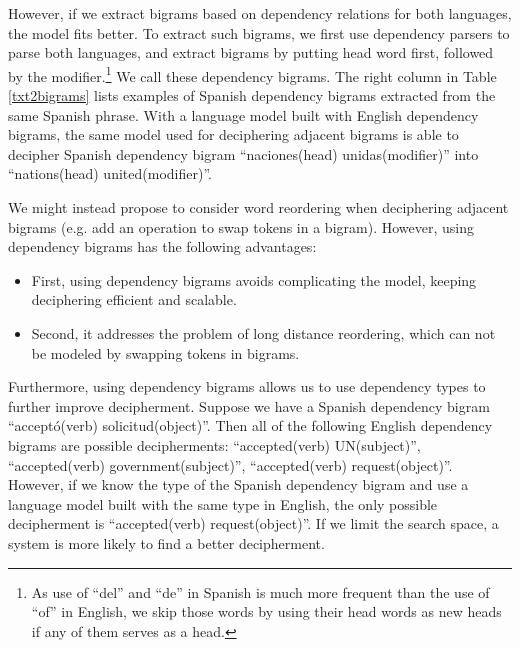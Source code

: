 However, if we extract bigrams based on dependency relations for both languages, the model fits better. To extract such bigrams, we first use dependency parsers to parse both languages, and extract bigrams by putting head word first, followed by the modifier.\footnote{As use of ``del'' and ``de'' in Spanish is much more frequent than the use of ``of'' in English, we skip those words by using their head words as new heads if any of them serves as a head.} We call these dependency bigrams. The right column in Table \ref{txt2bigrams} lists examples of Spanish dependency bigrams extracted from the same Spanish phrase. With a language model built with English dependency bigrams, the same model used for deciphering adjacent bigrams is able to decipher Spanish dependency bigram ``naciones(head) unidas(modifier)'' into ``nations(head) united(modifier)''.

We might instead propose to consider word reordering when deciphering adjacent bigrams (e.g. add an operation to swap tokens in a bigram). However, using dependency bigrams has the following advantages:

\begin{itemize}
\item  First, using dependency bigrams avoids complicating the model, keeping deciphering efficient and scalable.
\item  Second, it addresses the problem of long distance reordering, which can not be modeled by swapping tokens in bigrams.
\end{itemize}

Furthermore, using dependency bigrams allows us to use dependency types to further improve decipherment. Suppose we have a Spanish dependency bigram ``accept\'{o}(verb) solicitud(object)''. Then all of the following English dependency bigrams are possible decipherments: ``accepted(verb) UN(subject)'', ``accepted(verb) government(subject)'', ``accepted(verb) request(object)''. However, if we know the type of the Spanish dependency bigram and use a language model built with the same type in English, the only possible decipherment is ``accepted(verb) request(object)''. If we limit the search space, a system is more likely to find a better decipherment.